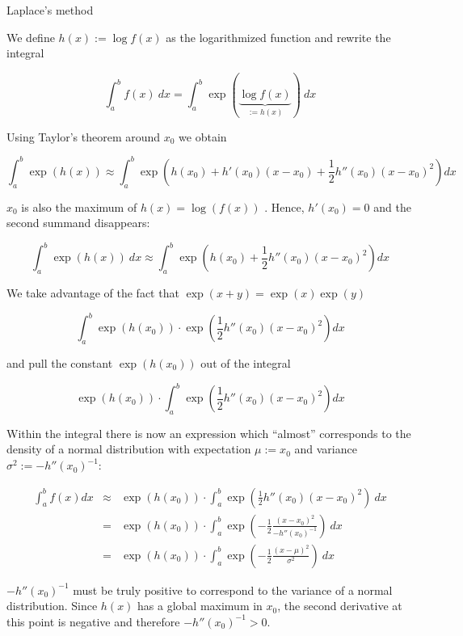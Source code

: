 \begin{vbframe}{Laplace's method}
\lz

We define $h(x) := \log f(x)$ as the logarithmized function and rewrite the integral

$$
\int_a^b f(x)~dx = \int_a^b \exp(\underbrace{\log f(x)}_{:=h(x)})~dx
$$

Using Taylor's theorem around $x_0$ we obtain

\small
$$
\int_a^b \exp\left(h(x)\right) \approx \int_a^b \exp\left( h(x_0) + h'(x_0)(x - x_0) + \frac{1}{2} h''(x_0)(x - x_0)^2\right) dx
$$
\normalsize

\framebreak

$x_0$ is also the maximum of $h(x) = \log(f(x))$ . Hence, $h'(x_0) = 0$ and the second summand disappears:

$$
\int_a^b \exp\left(h(x)\right)~dx \approx \int_a^b \exp\left( h(x_0) + \frac{1}{2} h''(x_0)(x - x_0)^2\right) dx
$$

We take advantage of the fact that $\exp(x + y) = \exp(x)\exp(y)$

$$
\int_a^b \exp\left( h(x_0)\right) \cdot \exp\left(\frac{1}{2} h''(x_0)(x - x_0)^2\right) dx
$$

and pull the constant $\exp\left( h(x_0)\right)$ out of the integral

$$
\exp\left( h(x_0)\right) \cdot\int_a^b \exp\left(\frac{1}{2} h''(x_0)(x - x_0)^2\right) dx
$$

\framebreak

Within the integral there is now an expression which \enquote{almost} corresponds to the density of a normal distribution with expectation $\mu := x_0$ and variance $\sigma^2 := -h''(x_0)^{-1}$:

\vspace{-0.3cm}

\begin{eqnarray*}
\int_a^b f(x) dx &\approx& \exp\left( h(x_0)\right) \cdot\int_a^b  \exp\left(\frac{1}{2} h''(x_0)(x - x_0)^2\right)~dx \\
&=& \exp\left( h(x_0)\right) \cdot\int_a^b  \exp\left(-\frac{1}{2} \frac{(x - x_0)^2}{-h''(x_0)^{-1}}\right) ~dx\\
&=& \exp\left( h(x_0)\right) \cdot\int_a^b  \exp\left(-\frac{1}{2} \frac{(x - \mu)^2}{\sigma^2}\right)~dx
\end{eqnarray*}

\vfill

\begin{footnotesize}
$-h''(x_0)^{-1}$ must be truly positive to correspond to the variance of a normal distribution. Since $h(x)$ has a global maximum in $x_0$, the second derivative at this point is negative and therefore $-h''(x_0)^{-1} > 0$.
\end{footnotesize}


\end{vbframe}
